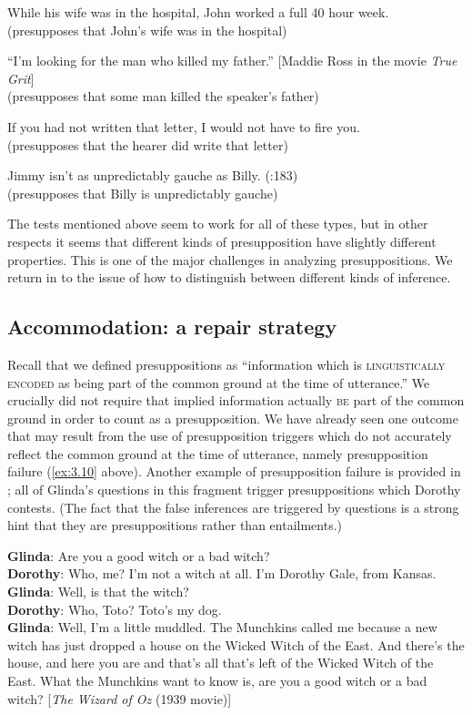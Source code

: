   \ex While his wife was in the hospital, John worked a full 40 hour week.\\
  (presupposes that John’s wife was in the hospital)

  \ex “I’m looking for the man who killed my father.”   [Maddie Ross in the movie \textit{True Grit}]\\
  (presupposes that some man killed the speaker’s father)

  \ex If you had not written that letter, I would not have to fire you.\\
  (presupposes that the hearer did write that letter) 

  \ex Jimmy isn’t as unpredictably gauche as Billy.   (\citealt{Levinson1983}:183)\\
  (presupposes that Billy is unpredictably gauche)
                       \z
                       \z


The tests mentioned above seem to work for all of these types, but in other respects it seems that different kinds of presupposition have slightly different properties. This is one of the major challenges in analyzing presuppositions. We return in  to the issue of how to distinguish between different kinds of inference.


\subsection{Accommodation: a repair strategy}\label{sec:} %

Recall that we defined presuppositions as “information which is \textsc{linguistically encoded} as being part of the common ground at the time of utterance.” We crucially did not require that implied information actually \textsc{be} part of the common ground in order to count as a presupposition. We have already seen one outcome that may result from the use of presupposition triggers which do not accurately reflect the common ground at the time of utterance, namely presupposition failure (\ref{ex:3.10} above). Another example of presupposition failure is provided in ; all of Glinda’s questions in this fragment trigger presuppositions which Dorothy contests. (The fact that the false inferences are triggered by questions is a strong hint that they are presuppositions rather than entailments.)


\ea \label{ex:3.15}
\textbf{Glinda}: Are you a good witch or a bad witch?\\
\textbf{Dorothy}: Who, me?  I’m not a witch at all.  I’m Dorothy Gale, from Kansas.\\
\textbf{Glinda}: Well, is that the witch?\\
\textbf{Dorothy}: Who, Toto?  Toto’s my dog.\\
\textbf{Glinda}: Well, I’m a little muddled. The Munchkins called me because a new witch has just dropped a house on the Wicked Witch of the East. And there’s the house, and here you are and that’s all that’s left of the Wicked Witch of the East. What the Munchkins want to know is, are you a good witch or a bad witch?   [\textit{The Wizard of Oz} (1939 movie)]
\z


